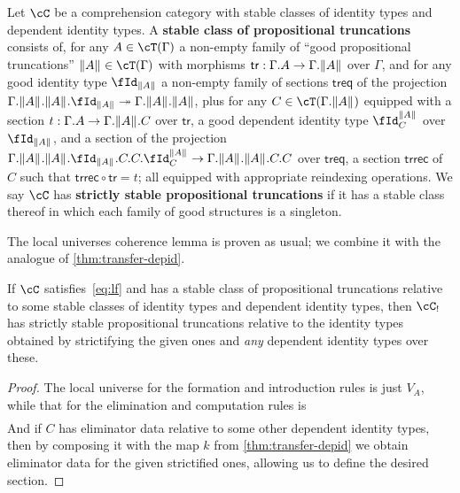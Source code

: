 \documentclass{amsart}
\let\C\cC
\let\T\cT
\def\tr{\mathsf{tr}}
\def\treq{\mathsf{treq}}
\def\trrec{\mathsf{trrec}}
\let\Id\fId
\begin{document}
\begin{defn}\label{defn:proptrunc}
  Let $\C$ be a comprehension category with stable classes of identity types and dependent identity types.
  A \textbf{stable class of propositional truncations} consists of, for any $A\in\T(\Gamma)$ a non-empty family of ``good propositional truncations'' $\brck A\in\T(\Gamma)$ with morphisms $\tr: \Gamma.A \to \Gamma.\brck A$ over $\Gamma$, and for any good identity type $\Id_{\brck A}$ a non-empty family of sections $\treq$ of the projection $\Gamma.\brck A.\brck A.\Id_{\brck A} \fib \Gamma.\brck A.\brck A$, plus for any $C\in\T(\Gamma.\brck A)$ equipped with a section $t:\Gamma.A\to\Gamma.\mathopen{}\left\Vert A\right\Vert_{}\mathclose{}.C$ over $\tr$, a good dependent identity type $\Id^{\brck A}_C$ over $\Id_{\brck A}$, and a section of the projection $\Gamma.\brck A.\brck A.\Id_{\brck A}.C.C.\Id^{\brck A}_C \to \Gamma.\brck A.\brck A.C.C$ over  $\treq$, a section $\trrec$ of $C$ such that $\trrec \circ \tr = t$; all equipped with appropriate reindexing operations.
  We say $\C$ has \textbf{strictly stable propositional truncations} if it has a stable class thereof in which each family of good structures is a singleton.
\end{defn}

The local universes coherence lemma is proven as usual; we combine it with the analogue of \cref{thm:transfer-depid}.

\begin{lem}
  If $\C$ satisfies~\eqref{eq:lf} and has a stable class of propositional truncations relative to some stable classes of identity types and dependent identity types, then $\C_!$ has strictly stable propositional truncations relative to the identity types obtained by strictifying the given ones and \emph{any} dependent identity types over these.
\end{lem}
\begin{proof}
  The local universe for the formation and introduction rules is just $V_A$, while that for the elimination and computation rules is
  \begin{align*}
    [& a:V_A,\\
    &c:\prod z:E_{\brck A}(a) . V_C \\
    &t:\prod x:E_{A}(a) . E_C(c(\tr(x))) \\
    &d:\prod x,y:E_{\brck A}(a), u:E_C(c(x)), v:E_C(c(y)) . E_{\Id^{\brck A}_C}(a,x,y,u,v) ]
  \end{align*}
  And if $C$ has eliminator data relative to some other dependent identity types, then by composing it with the map $k$ from \cref{thm:transfer-depid} we obtain eliminator data for the given strictified ones, allowing us to define the desired section.
\end{proof}
\end{document}
